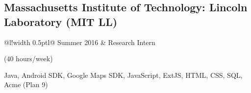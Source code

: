 \documentclass[]{article}
\newcommand\VRule{\color{lightgray}\vrule width 0.5pt}
\begin{document}


\subsection*{Massachusetts Institute of Technology: Lincoln Laboratory (MIT LL) \hfill {}}

\begin{tabular}[t]{@{}l!{\VRule}l@{}}
{\footnotesize Summer 2016} & Research Intern\\
\end{tabular}\hfill {\footnotesize (40 hours/week)}

Java, Android SDK, Google Maps SDK, JavaScript, ExtJS, HTML, CSS, SQL, Acme (Plan 9)


\end{document}
